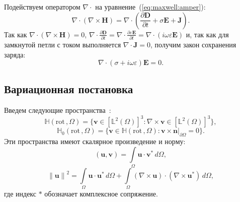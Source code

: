 \documentclass[a4paper,14pt]{article}
\begin{document}
Подействуем оператором $\nabla \cdot$ на уравнение~(\ref{eq:maxwell:amper}):
\begin{equation*}
	\nabla \cdot ( \nabla \times \mathbf{H} ) = \nabla \cdot ( \frac{\partial \mathbf{D}}{\partial t} + \sigma \mathbf{E} + \mathbf{J} ) .
\end{equation*}
Так как $\nabla \cdot ( \nabla \times \mathbf{H} ) = 0$, $\nabla \cdot \frac{\partial \mathbf{D}}{\partial t} = \nabla \cdot \frac{\partial \varepsilon \mathbf{E}}{\partial t} = \nabla \cdot (i \omega \varepsilon \mathbf{E})$ и, так как для замкнутой петли с током выполняется $\nabla \cdot \mathbf{J} = 0$, получим закон сохранения заряда:
\begin{equation}
	\nabla \cdot ( \sigma + i \omega \varepsilon ) \mathbf{E} = 0 . \label{eq:charge}
\end{equation}


\subsection{Вариационная постановка}
Введем следующие пространства~\citep{balandin_vfem,monk}:
\begin{equation*}
	\mathbb{H} ( \mathrm{rot}\,, \Omega ) = \lbrace \mathbf{v} \in [\mathbb{L}^{2}(\Omega)]^{3} : \nabla \times \mathbf{v} \in [\mathbb{L}^{2}(\Omega)]^{3} \rbrace , \label{eq:H_rot}
\end{equation*}
\begin{equation*}
	\mathbb{H}_{0}( \mathrm{rot}\,, \Omega ) = \lbrace \mathbf{v} \in \mathbb{H}(\mathrm{rot}\,, \Omega) : \left. \mathbf{v} \times \mathbf{n} \right|_{\partial \Omega} = 0  \rbrace . \label{eq:H0_rot}
\end{equation*}
Эти пространства имеют скалярное произведение и норму:
\begin{equation*}
	( \mathbf{u}, \mathbf{v} ) = \int\limits_{\Omega} \mathbf{u} \cdot \mathbf{v}^{*} \,d\Omega ,
\end{equation*}
\begin{equation*}
	\left \| \mathbf{u} \right \| ^{2} = \int\limits_{\Omega} \mathbf{u} \cdot \mathbf{u}^{*} \,d\Omega + \int\limits_{\Omega} ( \nabla \times \mathbf{u} ) \cdot ( \nabla \times \mathbf{u}^{*} ) \,d\Omega ,
\end{equation*}
где индекс $*$ обозначает комплексное сопряжение.
\end{document}
